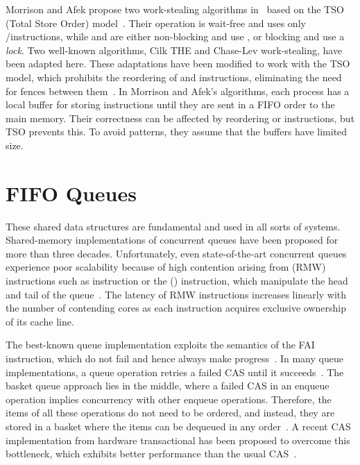Morrison and Afek propose two work-stealing algorithms in~\cite{fencefreeworkproceedings} based on the TSO (Total Store Order) model~\cite{DBLP_journals_cacm_SewellSONM10}. Their \Put operation is wait-free and uses only \R/\W instructions, while \Take and \Steal are either non-blocking and use \CAS, or blocking and use a \emph{lock}. Two well-known algorithms, Cilk THE and Chase-Lev work-stealing, have been adapted here. These adaptations have been modified to work with the TSO model, which prohibits the reordering of \W and \R instructions, eliminating the need for fences between them~\cite{circular.work.stealing, DBLP_conf_pldi_FrigoLR98}. In Morrison and Afek's algorithms, each process has a local buffer for storing \W instructions until they are sent in a FIFO order to the main memory. Their correctness can be affected by reordering \W or \R instructions, but TSO prevents this. To avoid \RAW patterns, they assume that the \W buffers have limited size.


\section{\label{section:FIFO-queues}FIFO Queues}

These shared data structures are fundamental and used in all sorts of systems. Shared-memory implementations of concurrent queues have been proposed for more than three decades. Unfortunately, even state-of-the-art concurrent queues experience poor scalability because of high contention arising from \RMW (RMW) instructions such as \CAS instruction or the (\FAI) instruction, which manipulate the head and tail of the queue~\cite{DBLP_conf_spaa_FatourouK11, DBLP_conf_ppopp_FatourouK12, basketqueue2007, DBLP_conf_ppopp_KoganP11, DBLP_journals_dc_Ladan-MozesS08, DBLP_conf_podc_MichaelS96, DBLP_journals_topc_Milman-SelaKLLP22, DBLP_conf_ppopp_YangM16}. The latency of RMW instructions increases linearly with the number of contending cores as each instruction acquires exclusive ownership of its cache line.

The best-known queue implementation exploits the semantics of the FAI instruction, which do not fail and hence always make progress~\cite{ppopp2013x86queues, DBLP_conf_ppopp_YangM16}. In many queue implementations, a queue operation retries a failed CAS until it succeeds~\cite{DBLP_conf_spaa_FatourouK11, DBLP_conf_ppopp_FatourouK12, basketqueue2007, DBLP_conf_ppopp_KoganP11, DBLP_journals_dc_Ladan-MozesS08, DBLP_conf_ppopp_YangM16}. The basket queue approach lies in the middle, where a failed CAS in an enqueue operation implies concurrency with other enqueue operations. Therefore, the items of all these operations do not need to be ordered, and instead, they are stored in a basket where the items can be dequeued in any order~\cite{basketqueue2007}. A recent CAS implementation from hardware transactional has been proposed to overcome this bottleneck, which exhibits better performance than the usual CAS~\cite{scalingconcurrent2020}.

